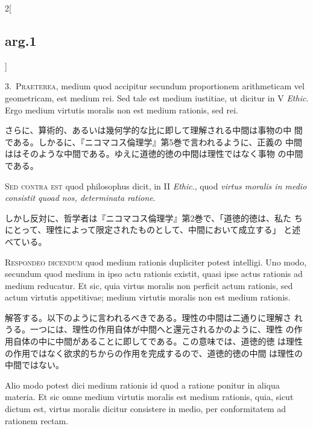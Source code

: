 \documentclass[paper=a4paper,fontsize=10pt,jafontsize=9pt,titlepage]{jlreq}
\begin{document}
\begin{paracol}{2}[\subsection{arg.1}]

3.~{\scshape Praeterea}, medium quod accipitur secundum proportionem
arithmeticam vel geometricam, est medium rei. Sed tale est medium
iustitiae, ut dicitur in V {\itshape Ethic}. Ergo medium virtutis
moralis non est medium rationis, sed rei.

\switchcolumn

さらに、算術的、あるいは幾何学的な比に即して理解される中間は事物の中
 間である。しかるに、『ニコマコス倫理学』第5巻で言われるように、正義の
 中間ははそのような中間である。ゆえに道徳的徳の中間は理性ではなく事物
 の中間である。

\switchcolumn*[\subsection{s.c.}]

{\scshape Sed contra est} quod philosophus dicit, in II {\itshape
Ethic}., quod {\itshape virtus moralis in medio consistit quoad nos,
determinata ratione}.

\switchcolumn

しかし反対に、哲学者は『ニコマコス倫理学』第2巻で、「道徳的徳は、私た
 ちにとって、理性によって限定されたものとして、中間において成立する」
 と述べている。


{\scshape Respondeo dicendum} quod medium rationis dupliciter potest
 intelligi. Uno modo, secundum quod medium in ipso actu rationis
 existit, quasi ipse actus rationis ad medium reducatur. Et sic, quia
 virtus moralis non perficit actum rationis, sed actum virtutis
 appetitivae; medium virtutis moralis non est medium rationis.

\switchcolumn

解答する。以下のように言われるべきである。理性の中間は二通りに理解さ
 れうる。一つには、理性の作用自体が中間へと還元されるかのように、理性
 の作用自体の中に中間があることに即してである。この意味では、道徳的徳
 は理性の作用ではなく欲求的ちからの作用を完成するので、道徳的徳の中間
 は理性の中間ではない。

\switchcolumn*

Alio modo potest dici medium rationis id quod a ratione ponitur in
 aliqua materia. Et sic omne medium virtutis moralis est medium
 rationis, quia, sicut dictum est, virtus moralis dicitur consistere
 in medio, per conformitatem ad rationem rectam.


\end{paracol}
\end{document}
